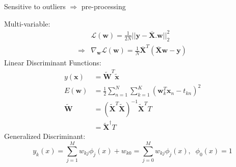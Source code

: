 \note Sensitive to outliers $\Rightarrow$ pre-processing

Multi-variable:
\begin{align*}
	&\mathcal{L}(\textbf{w}) = \frac{1}{2N} ||\textbf{y}-\overline{\textbf{X}}.\textbf{w}||^2_2 \\
	\Rightarrow &\nabla_\textbf{w}\mathcal{L}(\textbf{w}) = \frac{1}{N} \overline{\textbf{X}}^T(\overline{\textbf{X}}\textbf{w}-\textbf{y})
\end{align*}
Linear Discriminant Functions:
\begin{align*}
	y(\textbf{x}) &= \widetilde{\textbf{W}}^T\widetilde{\textbf{x}} \\
	E(\textbf{w}) &= \frac{1}{2} \sum_{n=1}^{N} \sum_{k=1}^{K} \left(\textbf{w}_k^T\textbf{x}_n-t_{kn}\right)^2 \\
	\widetilde{\textbf{W}} &= \left(\widetilde{\textbf{X}}^T\widetilde{\textbf{X}}\right)^{-1}\widetilde{\textbf{X}}^TT \\
	&= \widetilde{\textbf{X}}^\dagger T
\end{align*}
Generalized Discriminant:
\begin{equation}
	y_k(x) = \sum_{j=1}^{M}w_{kj}\phi_j(x) + w_{k0} = \sum_{j=0}^M w_{kj}\phi_j(x), \;\;\phi_0(x) = 1
\end{equation}